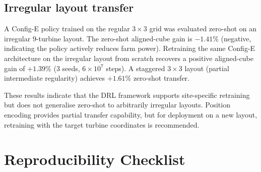 \documentclass{article}
\begin{document}
\subsection{Irregular layout transfer}

A Config-E policy trained on the regular $3{\times}3$ grid was evaluated zero-shot on an irregular $9$-turbine layout. The zero-shot aligned-cube gain is $-1.41\%$ (negative, indicating the policy actively reduces farm power). Retraining the same Config-E architecture on the irregular layout from scratch recovers a positive aligned-cube gain of $+1.39\%$ (3 seeds, $6{\times}10^{7}$ steps). A staggered $3{\times}3$ layout (partial intermediate regularity) achieves $+1.61\%$ zero-shot transfer.

These results indicate that the DRL framework supports site-specific retraining but does not generalise zero-shot to arbitrarily irregular layouts. Position encoding provides partial transfer capability, but for deployment on a new layout, retraining with the target turbine coordinates is recommended.

\section{Reproducibility Checklist}\label{sec:repro}
\end{document}
